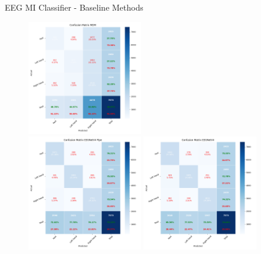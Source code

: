 \begin{frame}{EEG MI Classifier - Baseline Methods}
\begin{minipage}[c]{.33\textwidth}
\begin{figure}[htpb!]
            \includegraphics[width=0.45\textwidth]{figures/classification/confusion_matrix_mdm}\\
            \includegraphics[width=0.45\textwidth]{figures/classification/confusion_matrix_eegnetv4_pipe}
            \includegraphics[width=0.45\textwidth]{figures/classification/confusion_matrix_eegnetv4}
        \end{figure}
    \end{minipage}
\end{frame}

